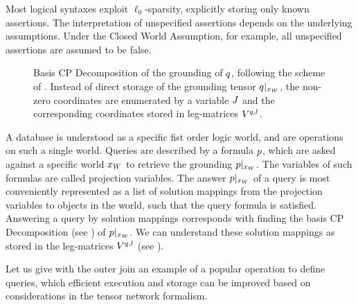 Most logical syntaxes exploit $\ell_0$-sparsity, explicitly storing only known assertions.
The interpretation of unspecified assertions depends on the underlying assumptions.
Under the Closed World Assumption, for example, all unspecified assertions are assumed to be false.

\begin{figure}[h]
    \begin{center}
        
    \end{center}
    \caption{Basis CP Decomposition of the grounding of $q$, following the scheme of .
    Instead of direct storage of the grounding tensor ${q}|_{x_{W}}$, the non-zero coordinates are enumerated by a variable $J$ and the corresponding coordinates stored in leg-matrices $V^{q,l}$.}
    \label{fig:groundingCP}
\end{figure}


A database is understood as a specific fist order logic world, and are operations on such a single world.
Queries are described by a formula $p$, which are asked against a specific world $x_{W}$ to retrieve the grounding ${p}|_{x_{W}}$.
The variables of such formulas are called projection variables.
The answer ${p}|_{x_{W}}$ of a query is most conveniently represented as a list of solution mappings from the projection variables to objects in the world, such that the query formula is satisfied.
Answering a query by solution mappings corresponds with finding the basis CP Decomposition (see ) of ${p}|_{x_{W}}$.
We can understand these solution mappings as stored in the leg-matrices $V^{q,l}$ (see ).

Let us give with the outer join an example of a popular operation to define queries, which efficient execution and storage can be improved based on considerations in the tensor network formalism.

